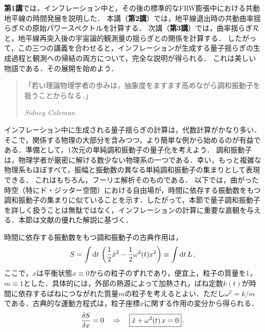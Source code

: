 {\bf 第1講}では，インフレーション中と，その後の標準的なFRW膨張中における共動地平線の時間発展を説明した．
本講（{\bf 第2講}）では，地平線退出時の共動曲率揺らぎ${\cal R}$の原始パワースペクトルを計算する．
次講（{\bf 第3講}）では，曲率揺らぎ${\cal R}$と，地平線再突入後の宇宙論的観測量の揺らぎとの関係を計算する．
したがって，この三つの講義を合わせると，インフレーションが生成する量子揺らぎの生成過程と観測への帰結の両方について，完全な説明が得られる．
これは美しい物語である．その展開を始めよう．

\label{sec:SHO}

\begin{quote}
「若い理論物理学者の歩みは，抽象度をますます高めながら調和振動子を扱うことからなる．」

{\it Sidney Coleman}
\end{quote}

インフレーション中に生成される量子揺らぎの計算は，代数計算がかなり多い．そこで，関係する物理の大部分を含みつつ，より簡単な例から始めるのが有益である．準備として，1次元の単純調和振動子の量子化を考えよう．
調和振動子は，物理学者が厳密に解ける数少ない物理系の一つである．幸い，もっと複雑な物理系もほぼすべて，振幅と振動数の異なる単純調和振動子の集まりとして表現できる．
これはもちろん，フーリエ解析そのものである．
以下では，曲がった時空（特にド・ジッター空間）における自由場が，時間に依存する振動数をもつ調和振動子の集まりに似ていることを示す．したがって，本節で量子調和振動子を詳しく扱うことは無駄ではなく，インフレーションの計算に重要な直観を与える．本節は文献\cite{Jacobson:2003vx}の優れた解説に基づく．


時間に依存する振動数をもつ調和振動子の古典作用は，
\begin{equation}
S = \int {\rm d} t \, \left(\frac{1}{2} \dot{x}^2 -\frac{1}{2} \omega^2(t) x^2 \right) \equiv \int {\rm d} t \, L\, ,
\end{equation}
ここで，$x$は平衡状態$x \equiv 0$からの粒子のずれであり，便宜上，粒子の質量を1，$m \equiv 1$とした．具体的には，外部の熱源によって加熱され，ばね定数$k(t)$が時間に依存するばねにつながれた質量$m$の粒子を考えるとよい．ただし$\omega^2 =k/m$である．古典的な運動方程式は，粒子座標$x$に関する作用の変分から得られる．
\begin{equation}
\frac{\delta S}{\delta x} = 0 \quad \Rightarrow \quad \fbox{$\displaystyle \ddot{x} + \omega^2(t)\, x =0 $}\, .
\end{equation}

